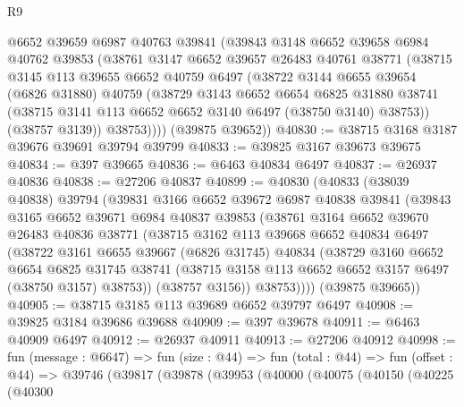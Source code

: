 \begin{lexlean}{R9}
\begin{coremodule}
        @6652
        @39659
        @6987
        @40763
        @39841
        (@39843
          @3148
          @6652
          @39658
          @6984
          @40762
          @39853
          (@38761
            @3147
            @6652
            @39657
            @26483
            @40761
            @38771
            (@38715
              @3145
              @113
              @39655
              @6652
              @40759
              @6497
              (@38722
                @3144
                @6655
                @39654
                (@6826 @31880)
                @40759
                (@38729
                  @3143
                  @6652
                  @6654
                  @6825
                  @31880
                  @38741
                  (@38715 @3141 @113 @6652 @6652 @3140 @6497 (@38750 @3140) @38753))
                (@38757 @3139))
              @38753))))
      (@39875 @39652))
@40830 := @38715 @3168 @3187 @39676 @39691 @39794 @39799
@40833 := @39825 @3167 @39673 @39675
@40834 := @397 @39665
@40836 := @6463 @40834 @6497
@40837 := @26937 @40836
@40838 := @27206 @40837
@40899 := @40830
    (@40833
      (@38039 @40838)
      @39794
      (@39831
        @3166
        @6652
        @39672
        @6987
        @40838
        @39841
        (@39843
          @3165
          @6652
          @39671
          @6984
          @40837
          @39853
          (@38761
            @3164
            @6652
            @39670
            @26483
            @40836
            @38771
            (@38715
              @3162
              @113
              @39668
              @6652
              @40834
              @6497
              (@38722
                @3161
                @6655
                @39667
                (@6826 @31745)
                @40834
                (@38729
                  @3160
                  @6652
                  @6654
                  @6825
                  @31745
                  @38741
                  (@38715 @3158 @113 @6652 @6652 @3157 @6497 (@38750 @3157) @38753))
                (@38757 @3156))
              @38753))))
      (@39875 @39665))
@40905 := @38715 @3185 @113 @39689 @6652 @39797 @6497
@40908 := @39825 @3184 @39686 @39688
@40909 := @397 @39678
@40911 := @6463 @40909 @6497
@40912 := @26937 @40911
@40913 := @27206 @40912
@40998 := fun (message : @6647) =>
  fun (size : @44) =>
  fun (total : @44) =>
  fun (offset : @44) =>
  @39746
    (@39817
      (@39878
        (@39953
          (@40000
            (@40075
              (@40150
                (@40225
                  (@40300

\end{coremodule}
\end{lexlean}
